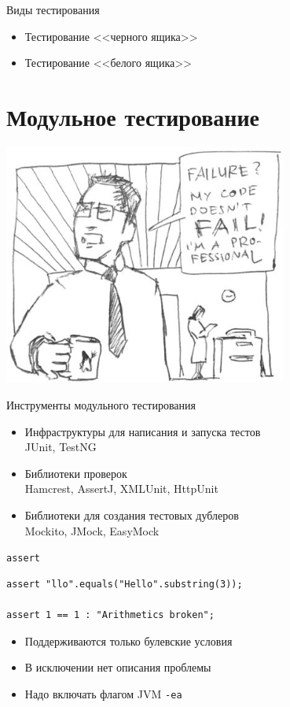\documentclass[unicode]{beamer}
\begin{document}
\begin{frame}{Виды тестирования}
\begin{itemize}
\item Тестирование <<черного ящика>>
    \bigskip

\item Тестирование <<белого ящика>>
\end{itemize}
\end{frame}


\section{Модульное тестирование}


\begin{frame}
\centering
\includegraphics[width=0.7\textwidth]{pics/fail.jpg}
\end{frame}


\begin{frame}{Инструменты модульного тестирования}
\begin{itemize}
\item Инфраструктуры для написания и запуска тестов\\
    JUnit, TestNG
    \bigskip

\item Библиотеки проверок\\
    Hamcrest, AssertJ, XMLUnit, HttpUnit
    \bigskip

\item Библиотеки для создания тестовых дублеров\\
    Mockito, JMock, EasyMock
\end{itemize}
\end{frame}


\begin{frame}[fragile]{\texttt{assert}}
\begin{lstlisting}
assert "llo".equals("Hello".substring(3));

assert 1 == 1 : "Arithmetics broken";
\end{lstlisting}
\bigskip
\begin{itemize}
\item Поддерживаются только булевские условия
\item В исключении нет описания проблемы
\item Надо включать флагом JVM \texttt{-ea}
\end{itemize}
\end{frame}
\end{document}
